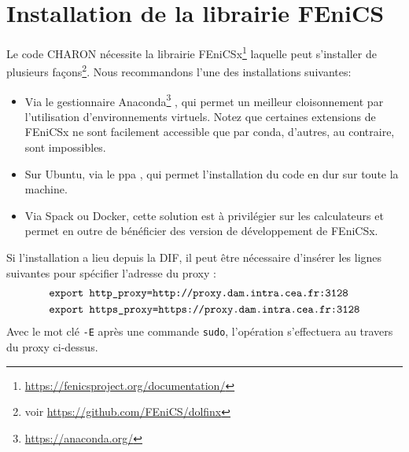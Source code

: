 \documentclass[10pt]{book}
\begin{document}
\section{Installation de la librairie FEniCS}\label{Section:Installation de la librairie FEniCS CHARON}
Le code CHARON nécessite la librairie FEniCSx\footnote{\url{https://fenicsproject.org/documentation/}} laquelle peut s'installer de plusieurs façons\footnote{voir \url{https://github.com/FEniCS/dolfinx}}. Nous recommandons l'une des installations suivantes:
\begin{itemize}
\item Via le gestionnaire Anaconda\footnote{\url{https://anaconda.org/}} , qui permet un meilleur cloisonnement par l'utilisation d'environnements virtuels. Notez que certaines extensions de FEniCSx ne sont facilement accessible que par conda, d'autres, au contraire, sont impossibles.
\item Sur Ubuntu, via le ppa , qui permet l'installation du code \og en dur \fg{} sur toute la machine.
\item Via Spack ou Docker, cette solution est à privilégier sur les calculateurs  et permet en outre de bénéficier des version de développement de FEniCSx.
\end{itemize}
Si l'installation a lieu depuis la DIF, il peut être nécessaire d'insérer les lignes suivantes pour spécifier l'adresse du proxy :
\begin{equation}
\begin{aligned}
&\verb|export http_proxy=http://proxy.dam.intra.cea.fr:3128|\\
&\verb|export https_proxy=https://proxy.dam.intra.cea.fr:3128|
\end{aligned}
\label{export_proxy}
\end{equation}
Avec le mot clé \texttt{-E} après une commande \texttt{sudo}, l'opération s'effectuera au travers du proxy ci-dessus.
\end{document}

